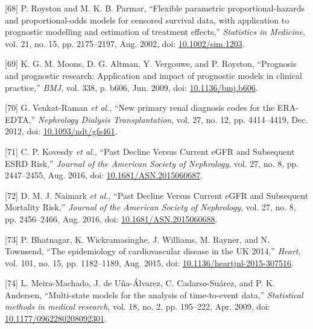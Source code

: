 \documentclass[
]{article}
\newenvironment{cslreferences}%
  {}%
  {\par}
\begin{document}
\begin{cslreferences}
\leavevmode\hypertarget{ref-royston_flexible_2002}{}%
{[}68{]} P. Royston and M. K. B. Parmar, ``Flexible parametric proportional-hazards and proportional-odds models for censored survival data, with application to prognostic modelling and estimation of treatment effects,'' \emph{Statistics in Medicine}, vol. 21, no. 15, pp. 2175--2197, Aug. 2002, doi: \href{https://doi.org/10.1002/sim.1203}{10.1002/sim.1203}.

\leavevmode\hypertarget{ref-moons_prognosis_2009-1}{}%
{[}69{]} K. G. M. Moons, D. G. Altman, Y. Vergouwe, and P. Royston, ``Prognosis and prognostic research: Application and impact of prognostic models in clinical practice,'' \emph{BMJ}, vol. 338, p. b606, Jun. 2009, doi: \href{https://doi.org/10.1136/bmj.b606}{10.1136/bmj.b606}.

\leavevmode\hypertarget{ref-venkat-raman_new_2012}{}%
{[}70{]} G. Venkat-Raman \emph{et al.}, ``New primary renal diagnosis codes for the ERA-EDTA,'' \emph{Nephrology Dialysis Transplantation}, vol. 27, no. 12, pp. 4414--4419, Dec. 2012, doi: \href{https://doi.org/10.1093/ndt/gfs461}{10.1093/ndt/gfs461}.

\leavevmode\hypertarget{ref-kovesdy_past_2016}{}%
{[}71{]} C. P. Kovesdy \emph{et al.}, ``Past Decline Versus Current eGFR and Subsequent ESRD Risk,'' \emph{Journal of the American Society of Nephrology}, vol. 27, no. 8, pp. 2447--2455, Aug. 2016, doi: \href{https://doi.org/10.1681/ASN.2015060687}{10.1681/ASN.2015060687}.

\leavevmode\hypertarget{ref-naimark_past_2016}{}%
{[}72{]} D. M. J. Naimark \emph{et al.}, ``Past Decline Versus Current eGFR and Subsequent Mortality Risk,'' \emph{Journal of the American Society of Nephrology}, vol. 27, no. 8, pp. 2456--2466, Aug. 2016, doi: \href{https://doi.org/10.1681/ASN.2015060688}{10.1681/ASN.2015060688}.

\leavevmode\hypertarget{ref-bhatnagar_epidemiology_2015}{}%
{[}73{]} P. Bhatnagar, K. Wickramasinghe, J. Williams, M. Rayner, and N. Townsend, ``The epidemiology of cardiovascular disease in the UK 2014,'' \emph{Heart}, vol. 101, no. 15, pp. 1182--1189, Aug. 2015, doi: \href{https://doi.org/10.1136/heartjnl-2015-307516}{10.1136/heartjnl-2015-307516}.

\leavevmode\hypertarget{ref-meira-machado_multi-state_2009}{}%
{[}74{]} L. Meira-Machado, J. de Uña-Álvarez, C. Cadarso-Suárez, and P. K. Andersen, ``Multi-state models for the analysis of time-to-event data,'' \emph{Statistical methods in medical research}, vol. 18, no. 2, pp. 195--222, Apr. 2009, doi: \href{https://doi.org/10.1177/0962280208092301}{10.1177/0962280208092301}.


\end{cslreferences}
\end{document}
